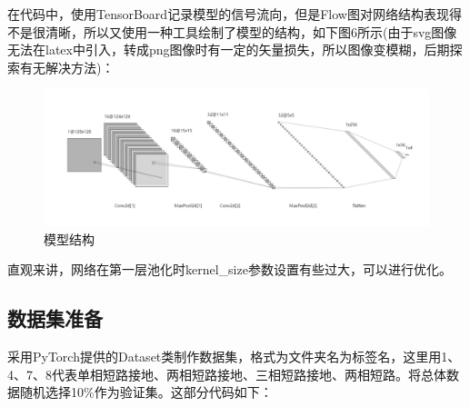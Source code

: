 \documentclass{article}
\begin{document}
	在代码中，使用TensorBoard记录模型的信号流向，但是Flow图对网络结构表现得不是很清晰，所以又使用一种工具绘制了模型的结构，如下图6所示(由于svg图像无法在latex中引入，转成png图像时有一定的矢量损失，所以图像变模糊，后期探索有无解决方法)：
	
	\begin{figure}[h]
		\includegraphics[width=15cm]{figure/6.png}
		\caption{模型结构}
	\end{figure}

	直观来讲，网络在第一层池化时kernel\_size参数设置有些过大，可以进行优化。
	
	\subsection{数据集准备}
	
	采用PyTorch提供的Dataset类制作数据集，格式为文件夹名为标签名，这里用1、4、7、8代表单相短路接地、两相短路接地、三相短路接地、两相短路。将总体数据随机选择10\%作为验证集。这部分代码如下：
	
\end{document}
